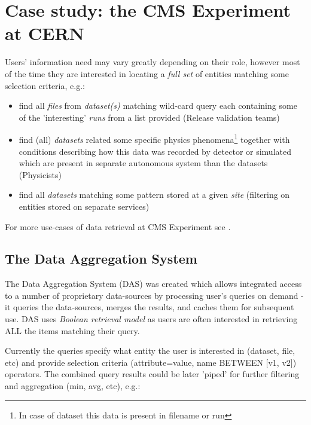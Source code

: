 \documentclass[a4paper,11pt,draft]{article}
\begin{document}
\section{Case study: the CMS Experiment at CERN}
Users' information need may vary greatly depending on their role, however most of the time they are interested in locating a \textit{full set} of entities matching some selection criteria, e.g.:
   \begin{itemize}
  		\item find all \textit{files} from \textit{dataset(s)} matching wild-card query each containing some of the 'interesting' \textit{runs} from a list provided (Release validation teams)
         \item find (all) \textit{datasets} related some specific physics phenomena\footnote{In case of dataset this data is present in filename or run} together with conditions describing how this data was recorded by detector or simulated which are present in separate autonomous system than the datasets (Physicists)
         \item find all \textit{datasets} matching some pattern stored at a given \textit{site} (filtering on entities stored on separate services)
   \end{itemize}                		

For more use-cases of data retrieval at CMS Experiment see \cite{CMS_data08}.


\subsection*{The Data Aggregation System}

The Data Aggregation System (DAS)\cite{Kuznetsov2010, Kuznetsov2011} was created which allows integrated access to a number of proprietary data-sources by processing user's queries on demand - it queries the data-sources, merges the results, and caches them for subsequent use. DAS uses \textit{Boolean retrieval model} as users are often interested in retrieving ALL the items matching their query.

Currently the queries specify what entity the user is interested in (dataset, file, etc) and provide selection criteria (attribute=value, name BETWEEN [v1, v2]) operators. The combined query results could be later 'piped' for further filtering and aggregation (min, avg, etc), e.g.:
\end{document}

